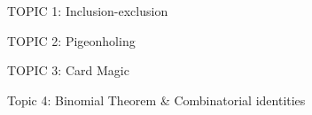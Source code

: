 \documentclass[handout]{mcs}
\begin{document}
\renewcommand{\reading}{
{Chapter~\bref{inc-ex_sec}{--\bref{cardmagic_sec}{, Inclusion-exclusion,
Pigeon Hole Principle, and Combinatorial Proof}}}}



\begin{staffnotes}
TOPIC 1: Inclusion-exclusion
\end{staffnotes}

\begin{staffnotes}
TOPIC 2: Pigeonholing
\end{staffnotes}

\begin{staffnotes}
TOPIC 3: Card Magic
\end{staffnotes}

\begin{staffnotes}
Topic 4: Binomial Theorem \& Combinatorial identities
\end{staffnotes}


\end{document}
